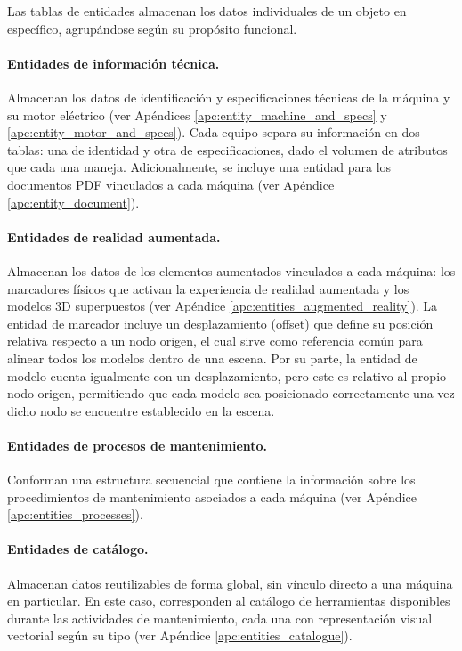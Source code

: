             Las tablas de entidades almacenan los datos individuales de un objeto en específico, agrupándose según su propósito funcional.

            \paragraph{Entidades de información técnica.} Almacenan los datos de identificación y especificaciones técnicas de la máquina y su motor eléctrico (ver Apéndices \ref{apc:entity_machine_and_specs} y \ref{apc:entity_motor_and_specs}). Cada equipo separa su información en dos tablas: una de identidad y otra de especificaciones, dado el volumen de atributos que cada una maneja. Adicionalmente, se incluye una entidad para los documentos PDF vinculados a cada máquina (ver Apéndice \ref{apc:entity_document}).

            \paragraph{Entidades de realidad aumentada.} Almacenan los datos de los elementos aumentados vinculados a cada máquina: los marcadores físicos que activan la experiencia de realidad aumentada y los modelos 3D superpuestos (ver Apéndice \ref{apc:entities_augmented_reality}). La entidad de marcador incluye un desplazamiento (offset) que define su posición relativa respecto a un nodo origen, el cual sirve como referencia común para alinear todos los modelos dentro de una escena. Por su parte, la entidad de modelo cuenta igualmente con un desplazamiento, pero este es relativo al propio nodo origen, permitiendo que cada modelo sea posicionado correctamente una vez dicho nodo se encuentre establecido en la escena.

            \paragraph{Entidades de procesos de mantenimiento.} Conforman una estructura secuencial que contiene la información sobre los procedimientos de mantenimiento asociados a cada máquina (ver Apéndice \ref{apc:entities_processes}).

            \paragraph{Entidades de catálogo.} Almacenan datos reutilizables de forma global, sin vínculo directo a una máquina en particular. En este caso, corresponden al catálogo de herramientas disponibles durante las actividades de mantenimiento, cada una con representación visual vectorial según su tipo (ver Apéndice \ref{apc:entities_catalogue}).

